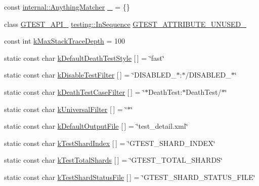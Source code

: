 \begin{DoxyCompactItemize}
\item 
const \hyperlink{classtesting_1_1internal_1_1AnythingMatcher}{internal\+::\+Anything\+Matcher} \hyperlink{namespacetesting_a4ba77a3f5b67166ff1b59d96a32346a2}{\+\_\+} = \{\}
\item 
class \hyperlink{gtest-port_8h_aa73be6f0ba4a7456180a94904ce17790}{G\+T\+E\+S\+T\+\_\+\+A\+P\+I\+\_\+} \hyperlink{classtesting_1_1InSequence}{testing\+::\+In\+Sequence} \hyperlink{namespacetesting_ae028f80705ba0f84ce7d036bf3793448}{G\+T\+E\+S\+T\+\_\+\+A\+T\+T\+R\+I\+B\+U\+T\+E\+\_\+\+U\+N\+U\+S\+E\+D\+\_\+}
\item 
const int \hyperlink{namespacetesting_ae605f2ccac04616bb7812ca72e517082}{k\+Max\+Stack\+Trace\+Depth} = 100
\item 
static const char \hyperlink{namespacetesting_a317291240e750e2142a23cbd52bc5aec}{k\+Default\+Death\+Test\+Style} \mbox{[}$\,$\mbox{]} = \char`\"{}fast\char`\"{}
\item 
static const char \hyperlink{namespacetesting_a0a2a3239fb038e7ce83195d89941872d}{k\+Disable\+Test\+Filter} \mbox{[}$\,$\mbox{]} = \char`\"{}D\+I\+S\+A\+B\+L\+E\+D\+\_\+$\ast$\+:$\ast$/D\+I\+S\+A\+B\+L\+E\+D\+\_\+$\ast$\char`\"{}
\item 
static const char \hyperlink{namespacetesting_a23c33f4bfcc3c2e5e620eff31a98892d}{k\+Death\+Test\+Case\+Filter} \mbox{[}$\,$\mbox{]} = \char`\"{}$\ast$Death\+Test\+:$\ast$Death\+Test/$\ast$\char`\"{}
\item 
static const char \hyperlink{namespacetesting_a236f8612e4b148d8d989a311a30a4557}{k\+Universal\+Filter} \mbox{[}$\,$\mbox{]} = \char`\"{}$\ast$\char`\"{}
\item 
static const char \hyperlink{namespacetesting_aa5a002b5bb3784c830b1c99aa2688f27}{k\+Default\+Output\+File} \mbox{[}$\,$\mbox{]} = \char`\"{}test\+\_\+detail.\+xml\char`\"{}
\item 
static const char \hyperlink{namespacetesting_a5f76dfdb8cb2664da54e320ecaba3643}{k\+Test\+Shard\+Index} \mbox{[}$\,$\mbox{]} = \char`\"{}G\+T\+E\+S\+T\+\_\+\+S\+H\+A\+R\+D\+\_\+\+I\+N\+D\+EX\char`\"{}
\item 
static const char \hyperlink{namespacetesting_a7542311baba200ebabd4065717606f6e}{k\+Test\+Total\+Shards} \mbox{[}$\,$\mbox{]} = \char`\"{}G\+T\+E\+S\+T\+\_\+\+T\+O\+T\+A\+L\+\_\+\+S\+H\+A\+R\+DS\char`\"{}
\item 
static const char \hyperlink{namespacetesting_a57d3eeb1e968b4f1efc4787b2d39fbfa}{k\+Test\+Shard\+Status\+File} \mbox{[}$\,$\mbox{]} = \char`\"{}G\+T\+E\+S\+T\+\_\+\+S\+H\+A\+R\+D\+\_\+\+S\+T\+A\+T\+U\+S\+\_\+\+F\+I\+LE\char`\"{}

\end{DoxyCompactItemize}
